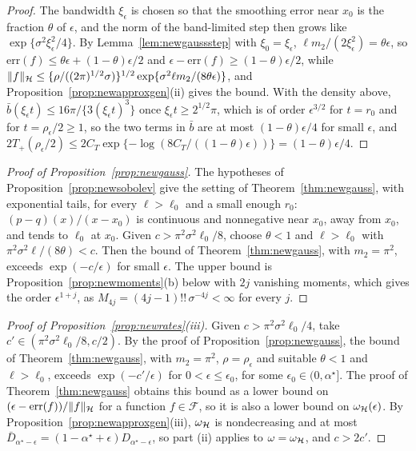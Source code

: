 \begin{proof}
The bandwidth $\xi_\epsilon$ is chosen so that the smoothing error near $x_0$ is the fraction $\theta$ of $\epsilon$,
and the norm of the band-limited step then grows like $\exp\{\sigma^2\xi_\epsilon^2/4\}$. By
Lemma~\ref{lem:newgaussstep} with $\xi_0=\xi_\epsilon$, $\ell m_2/(2\xi_\epsilon^2)=\theta\epsilon$, so
$\mathrm{err}(f)\le\theta\epsilon+(1-\theta)\epsilon/2$ and $\epsilon-\mathrm{err}(f)\ge(1-\theta)\epsilon/2$, while
$\|f\|_{\mathcal{H}}\le\{\rho/((2\pi)^{1/2}\sigma)\}^{1/2}\exp\{\sigma^2\ell m_2/(8\theta\epsilon)\}$, and Proposition~\ref{prop:newapproxgen}(ii) gives
the bound. With the density above, $\bar b(\xi_\epsilon t)\le16\pi/\{3(\xi_\epsilon t)^3\}$ once $\xi_\epsilon t\ge2^{1/2}\pi$, which is
of order $\epsilon^{3/2}$ for $t=r_0$ and for $t=\rho_\epsilon/2\ge1$, so the two terms in $\bar b$ are at most $(1-\theta)\epsilon/4$
for small $\epsilon$, and $2T_+(\rho_\epsilon/2)\le2C_T\exp\{-\log(8C_T/((1-\theta)\epsilon))\}=(1-\theta)\epsilon/4$.
\end{proof}

\begin{proof}[Proof of Proposition~\ref{prop:newgauss}]
The hypotheses of Proposition~\ref{prop:newsobolev} give the setting of Theorem~\ref{thm:newgauss}, with exponential tails,
for every $\ell>\ell_0$ and a small enough $r_0$: $(p-q)(x)/(x-x_0)$ is continuous and nonnegative near $x_0$, away from $x_0$,
and tends to $\ell_0$ at $x_0$. Given $c>\pi^2\sigma^2\ell_0/8$, choose $\theta<1$ and $\ell>\ell_0$ with $\pi^2\sigma^2\ell/(8\theta)<c$. Then the
bound of Theorem~\ref{thm:newgauss}, with $m_2=\pi^2$, exceeds $\exp(-c/\epsilon)$ for small $\epsilon$. The upper bound is
Proposition~\ref{prop:newmoments}(b) below with $2j$ vanishing moments, which gives the order $\epsilon^{1+j}$, as
$M_{4j}=(4j-1)!!\,\sigma^{-4j}<\infty$ for every $j$.
\end{proof}

\begin{proof}[Proof of Proposition~\ref{prop:newrates}(iii)]
Given $c>\pi^2\sigma^2\ell_0/4$, take $c'\in(\pi^2\sigma^2\ell_0/8,c/2)$. By the proof of Proposition~\ref{prop:newgauss},
the bound of Theorem~\ref{thm:newgauss}, with $m_2=\pi^2$, $\rho=\rho_\epsilon$ and suitable $\theta<1$ and
$\ell>\ell_0$, exceeds $\exp(-c'/\epsilon)$ for $0<\epsilon\le\epsilon_0$, for some $\epsilon_0\in(0,\alpha^\star]$. The
proof of Theorem~\ref{thm:newgauss} obtains this bound as a lower bound on $(\epsilon-\mathrm{err}(f))/\|f\|_{\mathcal{H}}$ for a
function $f\in\mathcal F$, so it is also a lower bound on $\omega_{\mathcal{H}}(\epsilon)$. By
Proposition~\ref{prop:newapproxgen}(iii), $\omega_{\mathcal{H}}$ is nondecreasing and at most
$\bar D_{\alpha^\star-\epsilon}=(1-\alpha^\star+\epsilon)D_{\alpha^\star-\epsilon}$, so part (ii) applies to $\omega=\omega_{\mathcal{H}}$,
and $c>2c'$.
\end{proof}


